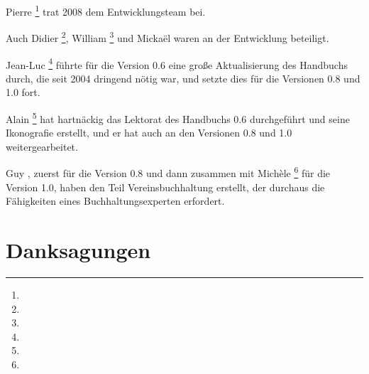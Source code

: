 Pierre \footnote{\urlPierreBiavaEmail{}} trat 2008 dem Entwicklungsteam bei.

Auch Didier \footnote{\urlDidierChevalierEmail{}}, William \footnote{\urlWilliamOllivierEmail{}} und Mickaël  waren an der Entwicklung beteiligt.

Jean-Luc \footnote{\urlJeanLucDuflotEmail{}} führte für die Version 0.6 eine große Aktualisierung des Handbuchs durch, die seit 2004 dringend nötig war, und setzte dies für die Versionen 0.8 und 1.0 fort.

Alain \footnote{\urlAlainLetientEmail{}} hat hartnäckig das Lektorat des Handbuchs 0.6 durchgeführt und seine Ikonografie erstellt, und er hat auch an den Versionen 0.8 und 1.0 weitergearbeitet.

Guy , zuerst für die Version 0.8 und dann zusammen mit Michèle \footnote{\urlMicheleBondilEmail{}} für die Version 1.0, haben den Teil Vereinsbuchhaltung erstellt, der durchaus die Fähigkeiten eines Buchhaltungsexperten erfordert.

\section{Danksagungen\label{introduction-thanks}}


